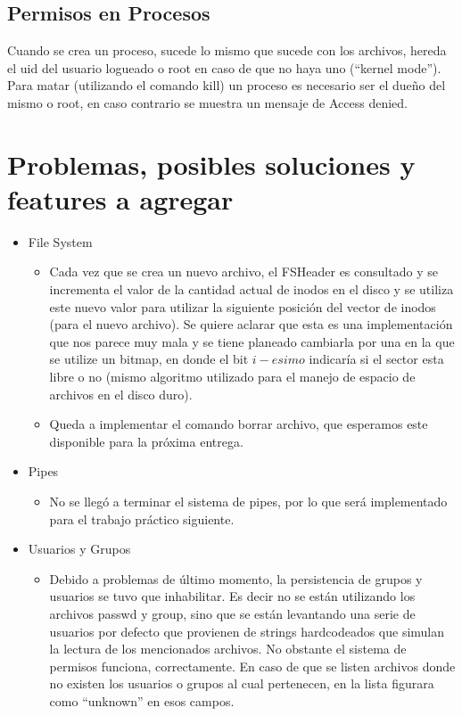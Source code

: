 \documentclass[english]{article}
\begin{document}
\subsection {Permisos en Procesos}
Cuando se crea un proceso, sucede lo mismo que sucede con los archivos, hereda el uid del usuario logueado o root en caso de que no haya uno (“kernel mode”).
Para matar (utilizando el comando kill) un proceso es necesario ser el dueño del mismo o root, en caso contrario se muestra un mensaje de Access denied.
 
\pagebreak{}

\section{Problemas, posibles soluciones y features a agregar}
\begin{itemize}
\item File System
\begin{itemize}
\item Cada vez que se crea un nuevo archivo, el FSHeader es consultado y
se incrementa el valor de la cantidad actual de inodos en el disco
y se utiliza este nuevo valor para utilizar la siguiente posición del
vector de inodos (para el nuevo archivo). Se quiere aclarar que esta
es una implementación que nos parece muy mala y se tiene planeado
cambiarla por una en la que se utilize un bitmap, en donde el bit
$i-esimo$ indicaría si el sector esta libre o no (mismo algoritmo
utilizado para el manejo de espacio de archivos en el disco duro). 
\item Queda a implementar el comando borrar archivo, que esperamos este disponible
para la próxima entrega.
\end{itemize}

\item Pipes
\begin{itemize}
\item No se llegó a terminar el sistema de pipes, por lo que será implementado para el trabajo práctico siguiente.
\end{itemize}

\item Usuarios y Grupos
\begin{itemize}
\item Debido a problemas de último momento, la persistencia de grupos y usuarios se tuvo que inhabilitar. Es decir no se están utilizando los archivos passwd y group, sino que se están levantando una serie de usuarios por defecto que provienen de strings hardcodeados que simulan la lectura de los mencionados archivos. No obstante el sistema de permisos funciona, correctamente. En caso de que se listen archivos donde no existen los usuarios o grupos al cual pertenecen, en la lista figurara como “unknown” en esos campos.
\end{itemize}


\end{itemize}
\end{document}
